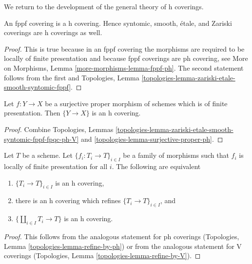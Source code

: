\noindent
We return to the development of the general theory of h coverings.

\begin{lemma}
\label{lemma-zariski-h}
An fppf covering is a h covering. Hence syntomic, smooth, \'etale,
and Zariski coverings are h coverings as well.
\end{lemma}

\begin{proof}
This is true because in an fppf covering the morphisms are
required to be locally of finite presentation and because
fppf coverings are ph covering, see More on Morphisms,
Lemma \ref{more-morphisms-lemma-fppf-ph}.
The second statement follows from the first and
Topologies, Lemma \ref{topologies-lemma-zariski-etale-smooth-syntomic-fppf}.
\end{proof}

\begin{lemma}
\label{lemma-surjective-proper-finite-presentation-h}
Let $f : Y \to X$ be a surjective proper morphism of schemes
which is of finite presentation. Then $\{Y \to X\}$ is an h covering.
\end{lemma}

\begin{proof}
Combine Topologies, Lemmas
\ref{topologies-lemma-zariski-etale-smooth-syntomic-fppf-fpqc-ph-V} and
\ref{topologies-lemma-surjective-proper-ph}.
\end{proof}

\begin{lemma}
\label{lemma-refine-by-h}
Let $T$ be a scheme. Let $\{f_i : T_i \to T\}_{i \in I}$ be a family
of morphisms such that $f_i$ is locally of finite presentation for all $i$.
The following are equivalent
\begin{enumerate}
\item $\{T_i \to T\}_{i \in I}$ is an h covering,
\item there is an h covering which refines $\{T_i \to T\}_{i \in I}$, and
\item $\{\coprod_{i \in I} T_i \to T\}$ is an h covering.
\end{enumerate}
\end{lemma}

\begin{proof}
This follows from the analogous statement for ph coverings
(Topologies, Lemma \ref{topologies-lemma-refine-by-ph})
or from the analogous statement for V coverings
(Topologies, Lemma \ref{topologies-lemma-refine-by-V}).
\end{proof}

